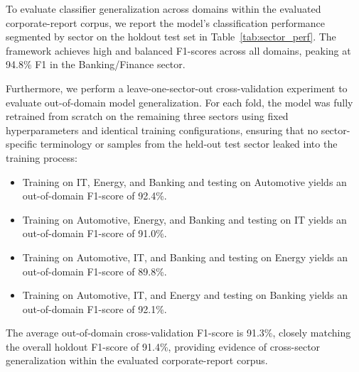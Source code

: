 \documentclass[journal]{IEEEtran}
\begin{document}
To evaluate classifier generalization across domains within the evaluated corporate-report corpus, we report the model's classification performance segmented by sector on the holdout test set in Table~\ref{tab:sector_perf}. The framework achieves high and balanced F1-scores across all domains, peaking at 94.8\% F1 in the Banking/Finance sector.

\begin{table}[h]
\centering
\caption{Classification Performance Segmented by Corporate Sector}
\label{tab:sector_perf}
\end{table}

Furthermore, we perform a leave-one-sector-out cross-validation experiment to evaluate out-of-domain model generalization. For each fold, the model was fully retrained from scratch on the remaining three sectors using fixed hyperparameters and identical training configurations, ensuring that no sector-specific terminology or samples from the held-out test sector leaked into the training process:
\begin{itemize}
    \item Training on IT, Energy, and Banking and testing on Automotive yields an out-of-domain F1-score of 92.4\%.
    \item Training on Automotive, Energy, and Banking and testing on IT yields an out-of-domain F1-score of 91.0\%.
    \item Training on Automotive, IT, and Banking and testing on Energy yields an out-of-domain F1-score of 89.8\%.
    \item Training on Automotive, IT, and Energy and testing on Banking yields an out-of-domain F1-score of 92.1\%.
\end{itemize}
The average out-of-domain cross-validation F1-score is 91.3\%, closely matching the overall holdout F1-score of 91.4\%, providing evidence of cross-sector generalization within the evaluated corporate-report corpus.
\end{document}
